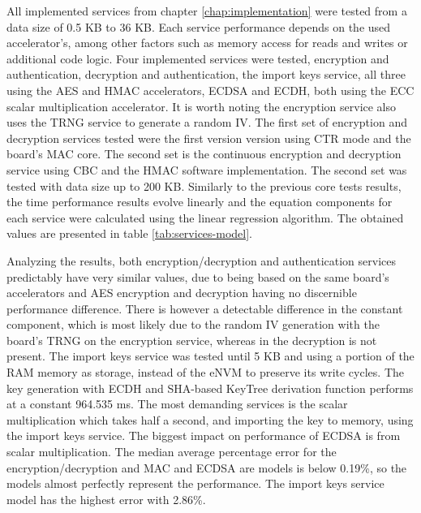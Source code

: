 All implemented services from chapter \ref{chap:implementation} were tested from a data size of 0.5 KB to 36 KB. Each service performance depends on the used accelerator's, among other factors such as memory access for reads and writes or additional code logic.
Four implemented services were tested, encryption and authentication, decryption and authentication, the import keys service, all three using the \ac{AES} and \ac{HMAC} accelerators, \ac{ECDSA} and \ac{ECDH}, both using the \ac{ECC} scalar multiplication accelerator. It is worth noting the encryption service also uses the \ac{TRNG} service to generate a random \ac{IV}. The first set of encryption and decryption services tested were the first version version using CTR mode and the board's MAC core. The second set is the continuous encryption and decryption service using CBC and the HMAC software implementation. The second set was tested with data size up to 200 KB.
Similarly to the previous core tests results, the time performance results evolve linearly and the equation components for each service were calculated using the linear regression algorithm. The obtained values are presented in table \ref{tab:services-model}.



Analyzing the results, both encryption/decryption and authentication services predictably have very similar values, due to being based on the same board's accelerators and \ac{AES} encryption and decryption having no discernible performance difference.
There is however a detectable difference in the constant component, which is most likely due to the random \ac{IV} generation with the board's \ac{TRNG} on the encryption service, whereas in the decryption is not present.
The import keys service was tested until 5 KB and using a portion of the RAM memory as storage, instead of the eNVM to preserve its write cycles.
The key generation with \ac{ECDH} and \ac{SHA}-based KeyTree derivation function performs at a constant 964.535 ms. The most demanding services is the scalar multiplication which takes half a second, and importing the key to memory, using the import keys service.
The biggest impact on performance of \ac{ECDSA} is from scalar multiplication.
The median average percentage error for the encryption/decryption and MAC and \ac{ECDSA} are models is below 0.19\%, so the models almost perfectly represent the performance. The import keys service model has the highest error with 2.86\%.

